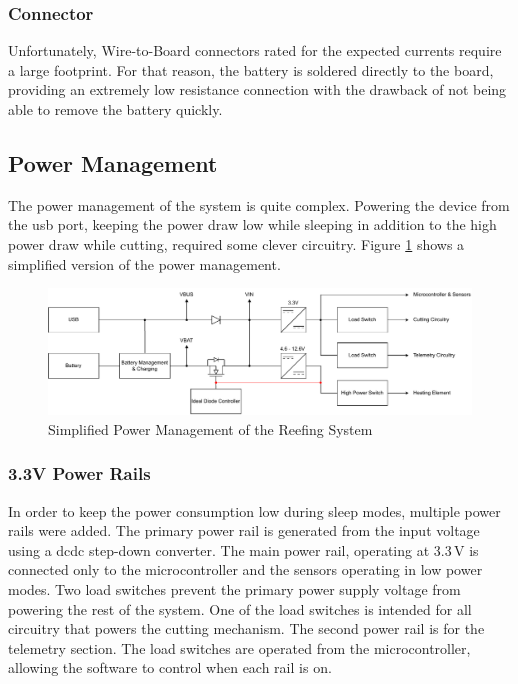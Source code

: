 \subsubsection{Connector}
Unfortunately, Wire-to-Board connectors rated for the expected currents require a large footprint. For that reason, the battery is soldered directly to the board, providing an extremely low resistance connection with the drawback of not being able to remove the battery quickly.

\newpage

\subsection{Power Management}\label{power-management}

The power management of the system is quite complex. Powering the device from the \acrshort{usb} port, keeping the power draw low while sleeping in addition to the high power draw while cutting, required some clever circuitry. Figure \ref{fig:pm} shows a simplified version of the power management.

\begin{figure}[h!]
	\centering
	\includegraphics[width=\textwidth]{images/pm}
	\caption{Simplified Power Management of the Reefing System}
	\label{fig:pm}
\end{figure}

\subsubsection{3.3V Power Rails}
In order to keep the power consumption low during sleep modes, multiple power rails were added. The primary power rail is generated from the input voltage using a \acrshort{dcdc} step-down converter. The main power rail, operating at 3.3\,V is connected only to the microcontroller and the sensors operating in low power modes. Two load switches prevent the primary power supply voltage from powering the rest of the system. One of the load switches is intended for all circuitry that powers the cutting mechanism. The second power rail is for the telemetry section. The load switches are operated from the microcontroller, allowing the software to control when each rail is on.

